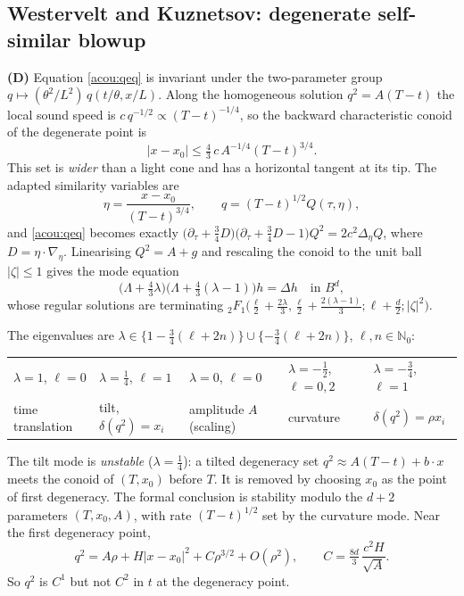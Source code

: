 \subsection{Westervelt and Kuznetsov: degenerate self-similar blowup}
\label{acou:sub-west}
\textbf{(D)} Equation \eqref{acou:qeq} is invariant under the two-parameter
group $q\mapsto(\theta^2/L^2)\,q(t/\theta,x/L)$. Along the homogeneous
solution $q^2=A(T-t)$ the local sound speed is
$c\,q^{-1/2}\propto(T-t)^{-1/4}$, so the backward characteristic conoid of
the degenerate point is
\[
  |x-x_0|\le\tfrac43\,c\,A^{-1/4}(T-t)^{3/4} .
\]
This set is \emph{wider} than a light cone and has a horizontal tangent at its
tip. The adapted similarity variables are
\[
  \eta=\frac{x-x_0}{(T-t)^{3/4}},\qquad q=(T-t)^{1/2}Q(\tau,\eta),
\]
and \eqref{acou:qeq} becomes exactly
$\big(\partial_\tau+\tfrac34D\big)\big(\partial_\tau+\tfrac34D-1\big)Q^2=2c^2\Delta_\eta Q$,
where $D=\eta\cdot\nabla_\eta$. Linearising $Q^2=A+g$ and rescaling the
conoid to the unit ball $|\zeta|\le1$ gives the mode equation
\[
  \big(\Lambda+\tfrac43\lambda\big)\big(\Lambda+\tfrac43(\lambda-1)\big)h=\Delta h\quad\text{in }B^d,
\]
whose regular solutions are terminating
${}_2F_1\big(\frac{\ell}{2}+\frac{2\lambda}{3},\frac{\ell}{2}+\frac{2(\lambda-1)}{3};\ell+\frac d2;|\zeta|^2\big)$.
\begin{proposition}\label{acou:prop-west}
The eigenvalues are
$\lambda\in\{1-\tfrac34(\ell+2n)\}\cup\{-\tfrac34(\ell+2n)\}$, $\ell,n\in\mathbb N_0$:
\begin{center}\small
\begin{tabular}{@{}lllll@{}}
\toprule
$\lambda=1$, $\ell=0$ & $\lambda=\frac14$, $\ell=1$ & $\lambda=0$, $\ell=0$ & $\lambda=-\frac12$, $\ell=0,2$ & $\lambda=-\frac34$, $\ell=1$\\
time translation & tilt, $\delta(q^2)=x_i$ & amplitude $A$ (scaling) & curvature & $\delta(q^2)=\rho x_i$\\
\bottomrule
\end{tabular}
\end{center}
The tilt mode is \emph{unstable} ($\lambda=\frac14$): a tilted degeneracy set
$q^2\approx A(T-t)+b\cdot x$ meets the conoid of $(T,x_0)$ before $T$. It is
removed by choosing $x_0$ as the point of first degeneracy. The formal
conclusion is stability modulo the $d+2$ parameters $(T,x_0,A)$, with rate
$(T-t)^{1/2}$ set by the curvature mode. Near the first degeneracy point,
\[
  q^2=A\rho+H|x-x_0|^2+C\rho^{3/2}+O(\rho^2),\qquad C=\tfrac{8d}{3}\,\frac{c^2H}{\sqrt A}.
\]
So $q^2$ is $C^1$ but not $C^2$ in $t$ at the degeneracy point.
\end{proposition}

